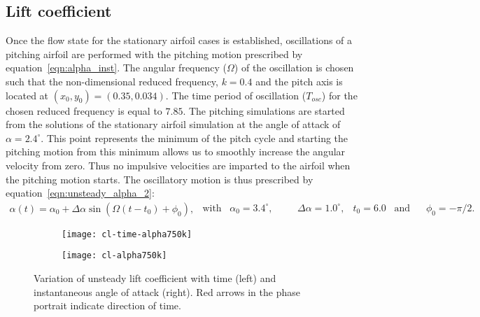 \subsection{Lift coefficient}
Once the flow state for the stationary airfoil cases is established, oscillations of a pitching airfoil are performed with the pitching motion prescribed by equation~\ref{eqn:alpha_inst}. The angular frequency ($\Omega$) of the oscillation is chosen such that the non-dimensional reduced frequency, $k=0.4$ and the pitch axis is located at $(x_{0},y_{0})=(0.35,0.034)$. The time period of oscillation ($T_{osc}$) for the chosen reduced frequency is equal to $7.85$. The pitching simulations are started from the solutions of the stationary airfoil simulation at the angle of attack of $\alpha=2.4^{\circ}$. This point represents the minimum of the pitch cycle and starting the pitching motion from this minimum allows us to smoothly increase the angular velocity from zero. Thus no impulsive velocities are imparted to the airfoil when the pitching motion starts. The oscillatory motion is thus prescribed by equation~\ref{eqn:unsteady_alpha_2}:
\begin{subequations}
	\begin{align}
		\alpha(t) = \alpha_{0} + \Delta\alpha\sin(\Omega (t-t_{0}) + \phi_{0}), %
	\end{align}
	\begin{align}
		\text{with}\hspace{10pt}\alpha_{0}=3.4^{\circ}, \hspace{20pt} & \Delta\alpha=1.0^{\circ}, & t_{0}=6.0\hspace{10pt} \text{and} \hspace{10pt}& \phi_{0}=-\pi/2.
	\end{align}
\label{eqn:unsteady_alpha_2}
\end{subequations}
\begin{figure}[h]
	\centering
	\begin{subfigure}[t]{0.48\textwidth}
		\texttt{[image: cl-time-alpha750k]}
		\caption{}
		\label{fig:750k_cl_time_alpha}		
	\end{subfigure}
	\begin{subfigure}[t]{0.495\textwidth}
		\texttt{[image: cl-alpha750k]}
		\caption{}
		\label{fig:750k_cl_alpha}			
	\end{subfigure}	
	\caption{Variation of unsteady lift coefficient with time (left) and instantaneous angle of attack (right). Red arrows in the phase portrait indicate direction of time.}
	\label{fig:750k_unsteady_lift}
\end{figure}

